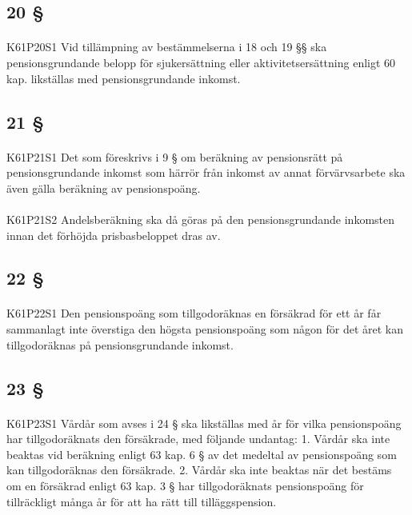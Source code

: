\documentclass[a4paper,notitlepage,openany,10pt]{book}
\begin{document}
\subsection*{20 §}
\paragraph*{}
{\tiny K61P20S1}
Vid tillämpning av bestämmelserna i 18 och 19 §§ ska pensionsgrundande belopp för sjukersättning eller aktivitetsersättning enligt 60 kap. likställas med pensionsgrundande inkomst.
\subsection*{21 §}
\paragraph*{}
{\tiny K61P21S1}
Det som föreskrivs i 9 § om beräkning av pensionsrätt på pensionsgrundande inkomst som härrör från inkomst av annat förvärvsarbete ska även gälla beräkning av pensionspoäng.
\paragraph*{}
{\tiny K61P21S2}
Andelsberäkning ska då göras på den pensionsgrundande inkomsten innan det förhöjda prisbasbeloppet dras av.
\subsection*{22 §}
\paragraph*{}
{\tiny K61P22S1}
Den pensionspoäng som tillgodoräknas en försäkrad för ett år får sammanlagt inte överstiga den högsta pensionspoäng som någon för det året kan tillgodoräknas på pensionsgrundande inkomst.
\subsection*{23 §}
\paragraph*{}
{\tiny K61P23S1}
Vårdår som avses i 24 § ska likställas med år för vilka pensionspoäng har tillgodoräknats den försäkrade, med följande undantag: 1. Vårdår ska inte beaktas vid beräkning enligt 63 kap. 6 § av det medeltal av pensionspoäng som kan tillgodoräknas den försäkrade. 2. Vårdår ska inte beaktas när det bestäms om en försäkrad enligt 63 kap. 3 § har tillgodoräknats pensionspoäng för tillräckligt många år för att ha rätt till tilläggspension.
\end{document}
